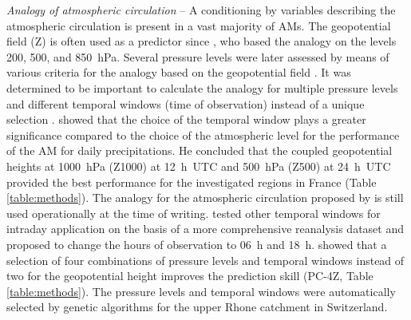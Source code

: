 \documentclass[review]{elsarticle}
\begin{document}
\textit{Analogy of atmospheric circulation} -- A conditioning by variables describing the atmospheric circulation is present in a vast majority of AMs. The geopotential field (Z) is often used as a predictor since \citet{Lorenz1969}, who based the analogy on the levels 200, 500, and 850~hPa. Several pressure levels were later assessed by means of various criteria for the analogy based on the geopotential field \citep{Duband1970, Duband1974, Duband1981, Guilbaud1997}. It was determined to be important to calculate the analogy for multiple pressure levels and different temporal windows (time of observation) instead of a unique selection \citep{Guilbaud1998, Obled2002}. \citet{Bontron2004} showed that the choice of the temporal window plays a greater significance compared to the choice of the atmospheric level for the performance of the AM for daily precipitations. He concluded that the coupled geopotential heights at 1000~hPa (Z1000) at 12~h~UTC and 500~hPa (Z500) at 24~h~UTC provided the best performance \citep[for a subset of the NCEP/NCAR Reanalysis I;][]{Kalnay1996, Kistler2001} for the investigated regions in France (Table \ref{table:methods}). The analogy for the atmospheric circulation proposed by \citet{Bontron2004} is still used operationally at the time of writing. \citet{Marty2010} tested other temporal windows for intraday application on the basis of a more comprehensive reanalysis dataset and proposed to change the hours of observation to 06~h and 18~h. \citet{Horton2018a} showed that a selection of four combinations of pressure levels and temporal windows instead of two for the geopotential height improves the prediction skill (PC-4Z, Table \ref{table:methods}). The pressure levels and temporal windows were automatically selected by genetic algorithms for the upper Rhone catchment in Switzerland.
\end{document}
